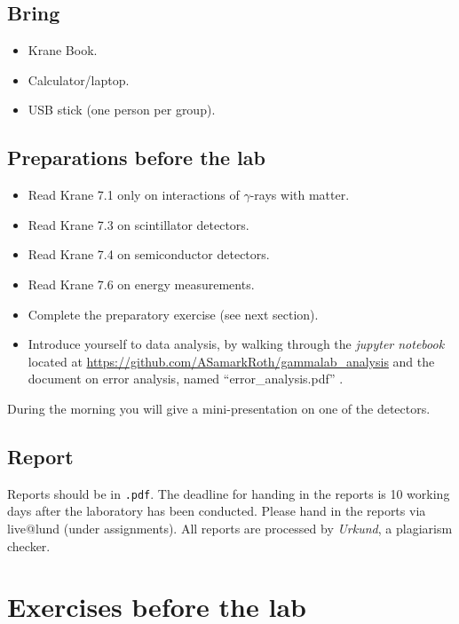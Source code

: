 \documentclass[12pt]{article}
\begin{document}
\subsection*{Bring}
\begin{itemize}
  \item Krane Book.
  \item Calculator/laptop.
  \item USB stick (one person per group).
\end{itemize}


\subsection*{Preparations before the lab}
\begin{itemize}
  \item Read Krane 7.1 only on interactions of $\gamma$-rays with matter. %
  \item Read Krane 7.3 on scintillator detectors.
  \item Read Krane 7.4 on semiconductor detectors.
  \item Read Krane 7.6 on energy measurements.
  \item Complete the preparatory exercise (see next section).
  \item Introduce yourself to data analysis, by walking through the {\it jupyter notebook} located at \href{https://github.com/ASamarkRoth/gammalab\_analysis}{https://github.com/ASamarkRoth/gammalab\_analysis} and the document on error analysis, named ``error\_analysis.pdf'' .

\end{itemize}
During the morning you will give a mini-presentation on one of the detectors.

\subsection*{Report}
Reports should be in \texttt{.pdf}. The deadline for handing in the
reports is 10 working days after the laboratory has been conducted.
Please hand in the reports via live@lund (under assignments).
All reports are processed by \textit{Urkund}, a plagiarism checker.


\section*{Exercises before the lab} \label{sec:exe}
\end{document}
